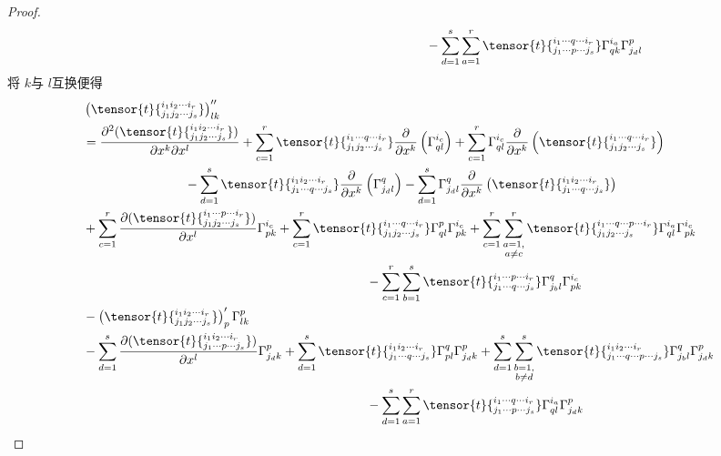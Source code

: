 \begin{proof}
\[\begin{split}
&\;\quad\quad\quad\quad\quad\quad\quad\quad\quad\quad\quad\quad\quad\quad\quad\quad\quad\quad\quad\quad\quad\quad-\sum_{d=1}^{s}\sum_{a=1}^{r} \tensor{t}{^{i_{1}\cdots q \cdots i_{r}}_{j_{1}\cdots p\cdots j_{s}}}\Gamma_{qk}^{i_{a}}  \Gamma_{j_{d}l}^{p}
\end{split}
\]
将 $ k $与 $ l $互换便得
\[
\begin{split}
&\left( \tensor{t}{^{i_{1}i_{2}\cdots i_{r}}_{j_{1}j_{2}\cdots j_{s}}} \right)^{\prime\prime}_{lk}\\
&=\frac{{\partial}^{2}(\tensor{t}{^{i_{1}i_{2}\cdots i_{r}}_{j_{1}j_{2}\cdots j_{s}}})}{\partial x^{k}\partial x^{l}}+\sum_{c=1}^{r}\tensor{t}{^{i_{1}\cdots q\cdots i_{r}}_{j_{1}j_{2}\cdots j_{s}}}\frac{\partial  }{\partial x^{k}} \left( \Gamma_{ql}^{i_{c}} \right) +\sum_{c=1}^{r}\Gamma_{ql}^{i_{c}}\frac{\partial  }{\partial x^{k}}\left( \tensor{t}{^{i_{1}\cdots q\cdots i_{r}}_{j_{1}j_{2}\cdots j_{s}}} \right)\\
& \quad\quad\quad\quad\quad\quad\quad\quad-\sum_{d=1}^{s} \tensor{t}{^{i_{1}i_{2}\cdots i_{r}}_{j_{1}\cdots q\cdots j_{s}}}\frac{\partial  }{\partial x^{k}}\left(\Gamma_{j_{d}l}^{q} \right)-\sum_{d=1}^{s}\Gamma_{j_{d}l}^{q}  \frac{\partial  }{\partial x^{k}}\left(\tensor{t}{^{i_{1}i_{2}\cdots i_{r}}_{j_{1}\cdots q\cdots j_{s}}}\right)\\
&+\sum_{c=1}^{r}\frac{{\partial}(\tensor{t}{^{i_{1}\cdots p\cdots i_{r}}_{j_{1}j_{2}\cdots j_{s}}} )}{\partial x^{l}}\Gamma_{pk}^{i_{c}}+\sum_{c=1}^{r}\tensor{t}{^{i_{1}\cdots q\cdots i_{r}}_{j_{1}j_{2}\cdots j_{s}}} \Gamma_{ql}^{p}\Gamma_{pk}^{i_{c}}+\sum_{c=1}^{r}\sum_{\substack{a=1,\\ a\neq c}}^{r}\tensor{t}{^{i_{1}\cdots q\cdots p\cdots i_{r}}_{j_{1}j_{2}\cdots j_{s}}}\Gamma_{ql}^{i_{a}}\Gamma_{pk}^{i_{c}}\\
&\;\quad\quad\quad\quad\quad\quad\quad\quad\quad\quad\quad\quad\quad\quad\quad\quad\quad\quad\quad\quad\quad\quad-\sum_{c=1}^{r}\sum_{b=1}^{s}\tensor{t}{^{i_{1}\cdots p\cdots i_{r}}_{j_{1}\cdots q\cdots j_{s}}}\Gamma_{j_{b}l}^{q}  \Gamma_{pk}^{i_{c}}\\
&-\left( \tensor{t}{^{i_{1}i_{2}\cdots i_{r}}_{j_{1}j_{2}\cdots j_{s}}} \right)^{\prime}_{p}\Gamma_{lk}^{p}\\
&-\sum_{d=1}^{s}\frac{{\partial}( \tensor{t}{^{i_{1}i_{2}\cdots  i_{r}}_{j_{1}\cdots p\cdots j_{s}}})}{\partial x^{l}}\Gamma_{j_{d}k}^{p}+\sum_{d=1}^{s}\tensor{t}{^{i_{1}i_{2}\cdots  i_{r}}_{j_{1}\cdots q\cdots j_{s}}} \Gamma_{pl}^{q}\Gamma_{j_{d}k}^{p}+\sum_{d=1}^{s}\sum_{\substack{b=1,\\ b\neq d}}^{s}\tensor{t}{^{i_{1}i_{2}\cdots  i_{r}}_{j_{1}\cdots q\cdots p\cdots j_{s}}}\Gamma_{j_{b}l}^{q}\Gamma_{j_{d}k}^{p}\\
&\;\quad\quad\quad\quad\quad\quad\quad\quad\quad\quad\quad\quad\quad\quad\quad\quad\quad\quad\quad\quad\quad\quad-\sum_{d=1}^{s}\sum_{a=1}^{r} \tensor{t}{^{i_{1}\cdots q \cdots i_{r}}_{j_{1}\cdots p\cdots j_{s}}}\Gamma_{ql}^{i_{a}}  \Gamma_{j_{d}k}^{p}
\end{split}
\]


\end{proof}
